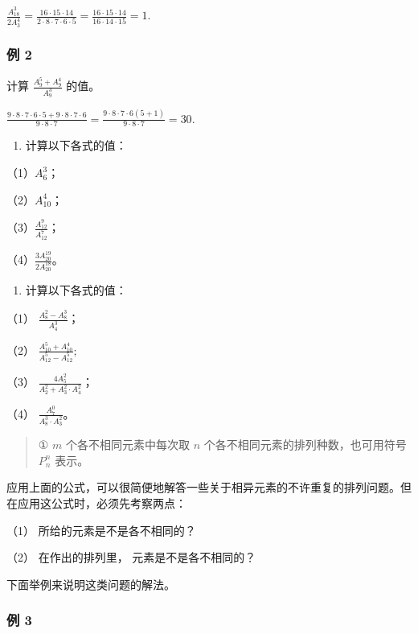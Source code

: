 \(\frac{A_{18}^{3}}{2A_{3}^{4}} = \frac{16\cdot 15\cdot 14}{2\cdot 8\cdot 7\cdot 6\cdot 5} = \frac{16\cdot 15\cdot 14}{16\cdot 14\cdot 15} = 1.\)

\subsubsection{例 2}

计算 \(\frac{A_{9}^{5}+A_{9}^{4}}{A_{9}^{3}}\) 的值。

\(\frac{9\cdot 8\cdot 7\cdot 6\cdot 5 + 9\cdot 8\cdot 7\cdot 6}{9\cdot 8\cdot 7} = \frac{9\cdot 8\cdot 7\cdot 6(5 + 1)}{9\cdot 8\cdot 7} = 30.\)

\begin{enumerate}
\item
  计算以下各式的值：
\end{enumerate}

（1）\(A_6^3\)；

（2）\(A_{10}^4\)；

（3）\(\frac{A_{12}^9}{A_{12}^7}\)；

（4）\(\frac{3A_{20}^{19}}{2A_{20}^{18}}\)。

\begin{enumerate}[start=2]
\item
  计算以下各式的值：
\end{enumerate}

（1） \(\frac{A_8^2 - A_8^3}{A_4^3}\)；

（2） \(\frac{A_{10}^{5} + A_{10}^{4}}{A_{12}^{5} - A_{12}^{5}};\)

（3） \(\frac{4A_5^2}{A_2^2 + A_3^2 \cdot A_4^2}\)；

（4） \(\frac{A_7^0}{A_8^3 \cdot A_3^2}\)。

\begin{quote}
① \(m\) 个各不相同元素中每次取 \(n\)
个各不相同元素的排列种数，也可用符号 \(P_{n}^{n}\) 表示。
\end{quote}

应用上面的公式，可以很简便地解答一些关于相异元素的不许重复的排列问题。但在应用这公式时，必须先考察两点：

（1） 所给的元素是不是各不相同的？

（2） 在作出的排列里， 元素是不是各不相同的？

下面举例来说明这类问题的解法。

\subsubsection{例 3}

